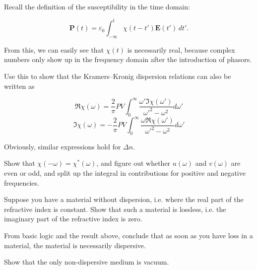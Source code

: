 \begin{exer}

Recall the definition of the susceptibility in the time domain:

\begin{equation}
\mathbf{P}(t)=\varepsilon_0 \int_{-\infty}^t \chi(t-t') \mathbf{E}(t')\, dt'.
\end{equation}

From this, we can easily see that $\chi(t)$ is necessarily real, because complex numbers only show up in the frequency domain after the introduction of phasors. 

Use this to show that the Kramers--Kronig dispersion relations can also be written as

$$\Re \chi(\omega) =  \frac{2}{\pi} PV \int_{0}^{\infty}{ \frac{\omega'\Im \chi(\omega')}{\omega'^2-\omega^2}d\omega'}$$
$$\Im \chi(\omega) = -\frac{2}{\pi} PV \int_{0}^{\infty}{ \frac{\omega \Re \chi(\omega')}{\omega'^2-\omega^2}d\omega'}$$

Obviously, similar expressions hold for $\Delta n$.

  \begin{hnt}
    Show that $\chi(-\omega) = \chi^*(\omega)$, and figure out whether $u(\omega)$ and $v(\omega)$ are even or odd, and split up the integral in contributions for positive and negative frequencies.
  \end{hnt}
\end{exer}

\begin{exer}
Suppose you have a material without dispersion, i.e. where the real part of the refractive index is constant. Show that such a material is lossless, i.e. the imaginary part of the refractive index is zero.
\end{exer}

\begin{exer}
From basic logic and the result above, conclude that as soon as you have loss in a material, the material is necessarily dispersive.
\end{exer}

\begin{exer}
Show that the only non-dispersive medium is vacuum.
\end{exer}


\pagebreak


